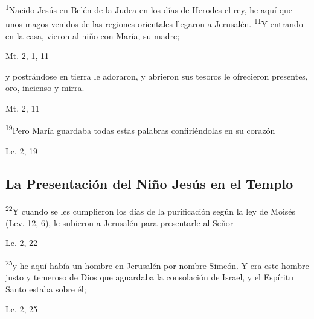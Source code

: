 \documentclass[a4paper,11pt]{article}
\begin{document}
      \begin{center}
        \textsuperscript{1}Nacido Jesús en Belén de la Judea en los días de Herodes el rey, he aquí que unos magos venidos de las regiones orientales llegaron a Jerusalén.
        \textsuperscript{11}Y entrando en la casa, vieron al niño con María, su madre;
      \end{center}

      \begin{center}
        Mt. 2, 1, 11        
      \end{center}
      
      \begin{center}
        y postrándose en tierra le adoraron, y abrieron sus tesoros le ofrecieron presentes, oro, incienso y mirra.
      \end{center}

      \begin{center}
        Mt. 2, 11         
      \end{center}      
      
      \begin{center}
        \textsuperscript{19}Pero María guardaba todas estas palabras confiriéndolas en su corazón
      \end{center}
      \begin{center}
        Lc. 2, 19        
      \end{center}
            
    \subsection*{\hfil La Presentación del Niño Jesús en el Templo \hfil}
      
      \begin{center}
        \textsuperscript{22}Y cuando se les cumplieron los días de la purificación según la ley de Moisés (Lev. 12, 6), le subieron a Jerusalén para presentarle al Señor
      \end{center}
      \begin{center}
        Lc. 2, 22         
      \end{center}
      
      \begin{center}
        \textsuperscript{25}y he aquí había un hombre en Jerusalén por nombre Simeón. Y era este hombre justo y temeroso de Dios que aguardaba la consolación de Israel, 
        y el Espíritu Santo estaba sobre él;
      \end{center}
      \begin{center}
        Lc. 2, 25         
      \end{center}
      
\end{document}

